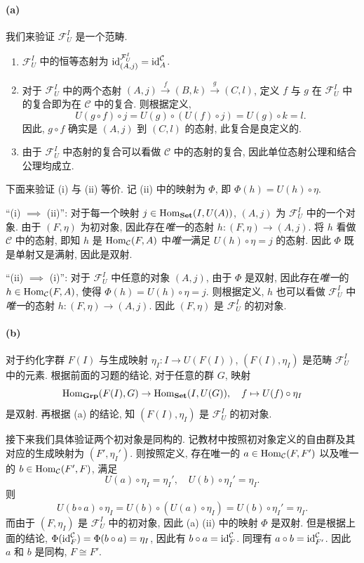 \documentclass{article}
\begin{document}
\begin{solution}
	\paragraph{(a)} 我们来验证 $\mathcal{F}_U^I$ 是一个范畴. 
	\begin{enumerate}[label=(\arabic*)]
		\item $\mathcal{F}_U^I$ 中的恒等态射为 $\operatorname{id}_{(A,j)}^{\mathcal{F}_U^I} = \operatorname{id}_A^{\mathcal{C}}$.
		\item 对于 $\mathcal{F}_U^I$ 中的两个态射 $(A,j) \xrightarrow{f} (B,k) \xrightarrow{g} (C,l)$, 定义 $f$ 与 $g$ 在 $\mathcal{F}_U^I$ 中的复合即为在 $\mathcal{C}$ 中的复合. 则根据定义, 
		 \[ U(g \circ f) \circ j = U(g) \circ (U(f) \circ j)
		 =U(g) \circ k = l. \]
		 因此, $g \circ f$ 确实是 $(A,j)$ 到 $(C,l)$ 的态射, 此复合是良定义的.
		 \item 由于 $\mathcal{F}_U^I$ 中态射的复合可以看做 $\mathcal{C}$ 中的态射的复合, 因此单位态射公理和结合公理均成立.
	\end{enumerate}

	下面来验证 (i) 与 (ii) 等价. 记 (ii) 中的映射为 $\Phi$, 即 $\Phi(h) = U(h) \circ \eta$.

	``(i) $\implies$ (ii)'': 对于每一个映射 $j \in \operatorname{Hom}_{\mathbf{Set}}(I, U(A))$, $(A,j)$ 为 $\mathcal{F}_{U}^I$ 中的一个对象. 由于 $(F,\eta)$ 为初对象, 因此存在\textit{唯一}的态射 $h: (F,\eta) \to (A,j)$. 将 $h$ 看做 $\mathcal{C}$ 中的态射, 即知 $h$ 是 $\operatorname{Hom}_{\mathcal{C}}(F,A)$	 中\textit{唯一}满足 $U(h) \circ \eta = j$ 的态射. 因此 $\Phi$ 既是单射又是满射, 因此是双射.

	``(ii) $\implies$ (i)'': 对于 $\mathcal{F}_U^I$ 中任意的对象 $(A,j)$, 由于 $\Phi$ 是双射, 因此存在\textit{唯一}的 $h \in \operatorname{Hom}_{\mathcal{C}}(F, A)$, 使得 $\Phi(h) = U(h) \circ \eta = j$. 则根据定义, $h$ 也可以看做 $\mathcal{F}_U^I$ 中\textit{唯一}的态射 $h: (F,\eta) \to (A, j)$. 因此 $(F,\eta)$ 是 $\mathcal{F}_U^I$ 的初对象.

	\paragraph{(b)} 对于约化字群 $F(I)$ 与生成映射 $\eta_I: I \to U(F(I))$, $(F(I), \eta_I)$ 是范畴 $\mathcal{F}_U^I$ 中的元素. 根据前面的习题的结论, 对于任意的群 $G$, 映射
	\[ \operatorname{Hom}_{\mathbf{Grp}}(F(I), G) \to \operatorname{Hom}_{\mathbf{Set}}(I, U(G)), \quad 
	f \mapsto U(f) \circ \eta_I \]
	是双射. 再根据 (a) 的结论, 知 $(F(I), \eta_I)$ 是 $\mathcal{F}_U^I$ 的初对象.

	接下来我们具体验证两个初对象是同构的. 记教材中按照初对象定义的自由群及其对应的生成映射为 $(F', \eta_I')$. 则按照定义, 存在唯一的 $a \in \operatorname{Hom}_{\mathcal{C}}(F, F')$ 以及唯一的 $b \in \operatorname{Hom}_{\mathcal{C}}(F',F)$, 满足 
	\[ U(a) \circ \eta_I = \eta_I', \quad 
	U(b) \circ \eta_I' = \eta_I. \]
	则 
	\[ U(b \circ a) \circ \eta_I = U(b) \circ (U(a) \circ \eta_I) = U(b) \circ \eta_I' = \eta_I. \]
	而由于 $(F, \eta_I)$ 是 $\mathcal{F}_U^I$ 中的初对象, 因此 (a) (ii) 中的映射 $\Phi$ 是双射. 但是根据上面的结论, $\Phi(\operatorname{id}_{F}^{\mathcal{C}}) = \Phi(b \circ a) = \eta_I$, 因此有 $b \circ a = \operatorname{id}_{F}^{\mathcal{C}}$. 同理有 $a \circ b = \operatorname{id}_{F'}^{\mathcal{C}}$. 因此 $a$ 和 $b$ 是同构, $F \cong F'$.


\end{solution}
\end{document}
